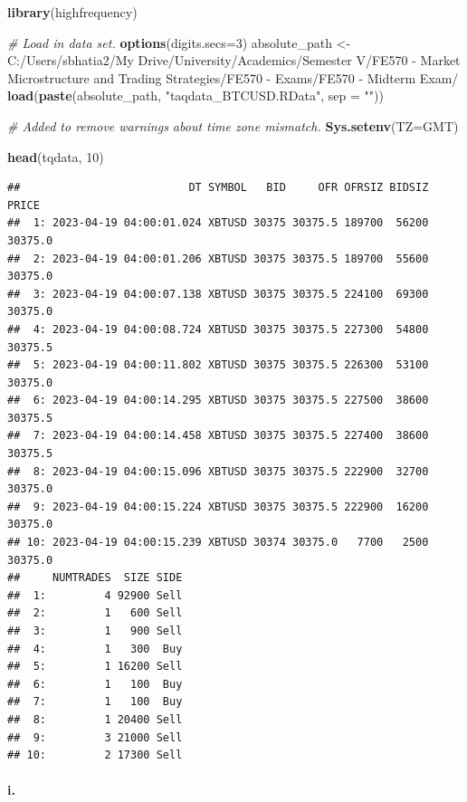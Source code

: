\documentclass[
]{article}
\newenvironment{Shaded}{\begin{snugshade}}{\end{snugshade}}
\newcommand{\AttributeTok}[1]{\textcolor[rgb]{0.13,0.29,0.53}{#1}}
\newcommand{\CommentTok}[1]{\textcolor[rgb]{0.56,0.35,0.01}{\textit{#1}}}
\newcommand{\DecValTok}[1]{\textcolor[rgb]{0.00,0.00,0.81}{#1}}
\newcommand{\FunctionTok}[1]{\textcolor[rgb]{0.13,0.29,0.53}{\textbf{#1}}}
\newcommand{\NormalTok}[1]{#1}
\newcommand{\OtherTok}[1]{\textcolor[rgb]{0.56,0.35,0.01}{#1}}
\newcommand{\StringTok}[1]{\textcolor[rgb]{0.31,0.60,0.02}{#1}}
\begin{document}
\begin{Shaded}
\begin{Highlighting}[]
\FunctionTok{library}\NormalTok{(highfrequency)}

\CommentTok{\# Load in data set.}
\FunctionTok{options}\NormalTok{(}\AttributeTok{digits.secs=}\DecValTok{3}\NormalTok{)}
\NormalTok{absolute\_path }\OtherTok{\textless{}{-}} \StringTok{\textquotesingle{}C:/Users/sbhatia2/My Drive/University/Academics/Semester V/FE570 {-} Market Microstructure and Trading Strategies/FE570 {-} Exams/FE570 {-} Midterm Exam/\textquotesingle{}}
\FunctionTok{load}\NormalTok{(}\FunctionTok{paste}\NormalTok{(absolute\_path, }\StringTok{"taqdata\_BTCUSD.RData"}\NormalTok{, }\AttributeTok{sep =} \StringTok{""}\NormalTok{))}

\CommentTok{\# Added to remove warnings about time zone mismatch.}
\FunctionTok{Sys.setenv}\NormalTok{(}\AttributeTok{TZ=}\StringTok{\textquotesingle{}GMT\textquotesingle{}}\NormalTok{)}

\FunctionTok{head}\NormalTok{(tqdata, }\DecValTok{10}\NormalTok{)}
\end{Highlighting}
\end{Shaded}

\begin{verbatim}
##                          DT SYMBOL   BID     OFR OFRSIZ BIDSIZ   PRICE
##  1: 2023-04-19 04:00:01.024 XBTUSD 30375 30375.5 189700  56200 30375.0
##  2: 2023-04-19 04:00:01.206 XBTUSD 30375 30375.5 189700  55600 30375.0
##  3: 2023-04-19 04:00:07.138 XBTUSD 30375 30375.5 224100  69300 30375.0
##  4: 2023-04-19 04:00:08.724 XBTUSD 30375 30375.5 227300  54800 30375.5
##  5: 2023-04-19 04:00:11.802 XBTUSD 30375 30375.5 226300  53100 30375.0
##  6: 2023-04-19 04:00:14.295 XBTUSD 30375 30375.5 227500  38600 30375.5
##  7: 2023-04-19 04:00:14.458 XBTUSD 30375 30375.5 227400  38600 30375.5
##  8: 2023-04-19 04:00:15.096 XBTUSD 30375 30375.5 222900  32700 30375.0
##  9: 2023-04-19 04:00:15.224 XBTUSD 30375 30375.5 222900  16200 30375.0
## 10: 2023-04-19 04:00:15.239 XBTUSD 30374 30375.0   7700   2500 30375.0
##     NUMTRADES  SIZE SIDE
##  1:         4 92900 Sell
##  2:         1   600 Sell
##  3:         1   900 Sell
##  4:         1   300  Buy
##  5:         1 16200 Sell
##  6:         1   100  Buy
##  7:         1   100  Buy
##  8:         1 20400 Sell
##  9:         3 21000 Sell
## 10:         2 17300 Sell
\end{verbatim}

\paragraph{i.}\label{i.}
\end{document}
